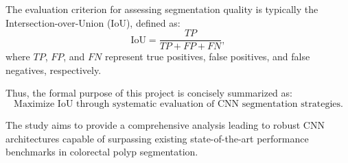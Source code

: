The evaluation criterion for assessing segmentation quality is typically the Intersection-over-Union (IoU), defined as:
\begin{equation}
    \text{IoU} = \frac{TP}{TP + FP + FN},
    \label{eq::iou}
\end{equation}
where \(TP\), \(FP\), and \(FN\) represent true positives, false positives, and false negatives, respectively.

Thus, the formal purpose of this project is concisely summarized as:
\begin{equation*}
    \text{Maximize IoU through systematic evaluation of CNN segmentation strategies.}
\end{equation*}

The study aims to provide a comprehensive analysis leading to robust CNN architectures capable of surpassing existing state-of-the-art performance benchmarks in colorectal polyp segmentation.


